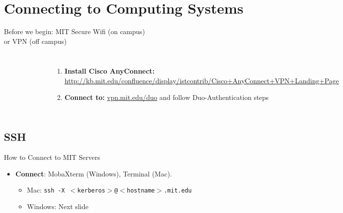 \documentclass{beamer}
\begin{document}
\section{Connecting to Computing Systems}
\begin{frame}{Before we begin: MIT Secure Wifi (on campus) \\ or VPN (off campus)}
   \begin{columns}[c]
        \begin{figure}
        \includegraphics[width=1.0\linewidth]{resources/03_vpn.png}
        \end{figure}
            \begin{enumerate}
                \item \textbf{Install Cisco AnyConnect:} \url{http://kb.mit.edu/confluence/display/istcontrib/Cisco+AnyConnect+VPN+Landing+Page}
        \item \textbf{Connect to:} \url{vpn.mit.edu/duo} and follow Duo-Authentication steps
            \end{enumerate}
    \end{columns}
\end{frame}
\subsection{SSH}
\begin{frame}{How to Connect to MIT Servers}
    \begin{itemize}
        \item \textbf{Connect}: MobaXterm (Windows), Terminal (Mac).
            \begin{itemize}
                \item Mac: \texttt{ssh -X $<$kerberos$>$@$<$hostname$>$.mit.edu}
                \item Windows: Next slide
            \end{itemize}
        \end{itemize}
\end{frame}
\end{document}

